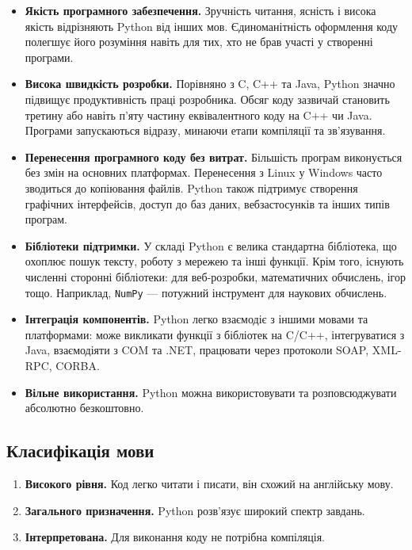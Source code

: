 \begin{itemize}
	\item \textbf{Якість програмного забезпечення.} Зручність читання, ясність і висока якість відрізняють Python від інших мов. Єдиноманітність оформлення коду полегшує його розуміння навіть для тих, хто не брав участі у створенні програми.
	
	\item \textbf{Висока швидкість розробки.} Порівняно з C, C++ та Java, Python значно підвищує продуктивність праці розробника. Обсяг коду зазвичай становить третину або навіть п’яту частину еквівалентного коду на C++ чи Java. Програми запускаються відразу, минаючи етапи компіляції та зв’язування.
	
	\item \textbf{Перенесення програмного коду без витрат.} Більшість програм виконується без змін на основних платформах. Перенесення з Linux у Windows часто зводиться до копіювання файлів. Python також підтримує створення графічних інтерфейсів, доступ до баз даних, вебзастосунків та інших типів програм.
	
	\item \textbf{Бібліотеки підтримки.} У складі Python є велика стандартна бібліотека, що охоплює пошук тексту, роботу з мережею та інші функції. Крім того, існують численні сторонні бібліотеки: для веб-розробки, математичних обчислень, ігор тощо. Наприклад, \texttt{NumPy} --- потужний інструмент для наукових обчислень.
	
	\item \textbf{Інтеграція компонентів.} Python легко взаємодіє з іншими мовами та платформами: може викликати функції з бібліотек на C/C++, інтегруватися з Java, взаємодіяти з COM та .NET, працювати через протоколи SOAP, XML-RPC, CORBA.
	
	\item \textbf{Вільне використання.} Python можна використовувати та розповсюджувати абсолютно безкоштовно.
\end{itemize}

\subsection*{Класифікація мови}

\begin{enumerate}
	\item \textbf{Високого рівня.} Код легко читати і писати, він схожий на англійську мову.
	\item \textbf{Загального призначення.} Python розв’язує широкий спектр завдань.
	\item \textbf{Інтерпретована.} Для виконання коду не потрібна компіляція.
\end{enumerate}

